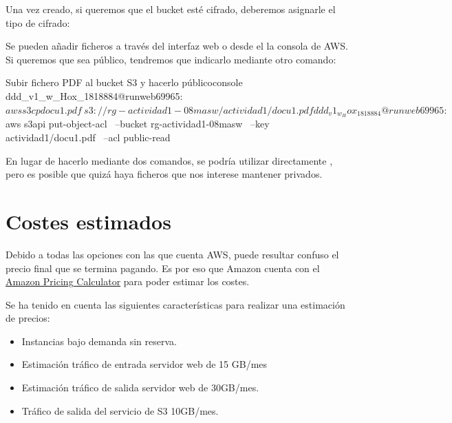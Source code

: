\documentclass{\ClassPath/viu-tfm-template}
\begin{document}
Una vez creado, si queremos que el bucket esté cifrado, deberemos asignarle el tipo de cifrado:



Se pueden añadir ficheros a través del interfaz web o desde el la consola de AWS. Si queremos que sea público, tendremos que indicarlo mediante otro comando:

\begin{mycode}{Subir fichero PDF al bucket S3 y hacerlo público}{console}{}
ddd_v1_w_Hox_1818884@runweb69965:~$ aws s3 cp docu1.pdf \
  s3://rg-actividad1-08masw/actividad1/docu1.pdf

ddd_v1_w_Hox_1818884@runweb69965:~$ aws s3api put-object-acl \
--bucket rg-actividad1-08masw \
--key actividad1/docu1.pdf \
--acl public-read
\end{mycode}

En lugar de hacerlo mediante dos comandos, se podría utilizar directamente , pero es posible que quizá haya ficheros que nos interese mantener privados.

\chapter{Costes estimados}
Debido a todas las opciones con las que cuenta AWS, puede resultar confuso el precio final que se termina pagando. Es por eso que Amazon cuenta con el \href{https://calculator.aws/}{Amazon Pricing Calculator} para poder estimar los costes.

Se ha tenido en cuenta las siguientes características para realizar una estimación de precios:

\begin{itemize}
    \vspace{-15 pt}
    \item Instancias bajo demanda sin reserva.
    \item Estimación tráfico de entrada servidor web de 15 GB/mes
    \item Estimación tráfico de salida servidor web de 30GB/mes.
    \item Tráfico de salida del servicio de S3 10GB/mes.
\end{itemize}
\end{document}
